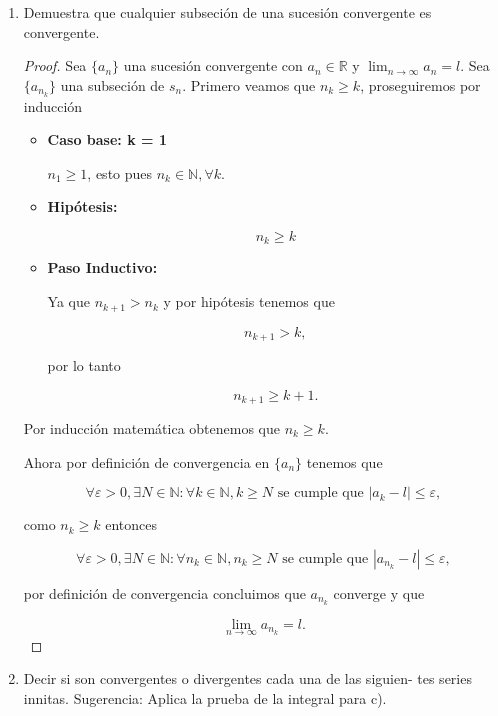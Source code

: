\documentclass[letterpaper]{article}
\theoremstyle{definition}
\theoremstyle{lemathm}
\theoremstyle{lemademthm}
\newcommand{\limninf}{\lim_{n\to\infty}}
\newcommand{\N}{\mathbb{N}}
\newcommand{\R}{\mathbb{R}}
\begin{document}
\begin{enumerate}
\begin{proof}
		\end{proof}

		\item Demuestra que cualquier subseción de una sucesión convergente es convergente.
		
		\begin{proof}
			Sea $\{a_n\}$ una sucesión convergente con $a_n \in \R$ y $\limninf a_n = l$. Sea $\{a_{n_k}\}$ una subseción de $s_n$. Primero veamos que $n_k \geq k$, proseguiremos por inducción

			\begin{itemize}
				\item \textbf{Caso base: k = 1}
				
				$n_1 \geq 1$, esto pues $n_k \in \N, \forall k$.

				\item \textbf{Hipótesis:}
				
				\[n_k \geq k\]

				\item \textbf{Paso Inductivo:}
				
				Ya que $n_{k+1} > n_k$ y por hipótesis tenemos que

				\[n_{k+1} > k,\]

				por lo tanto

				\[n_{k+1} \geq k + 1.\]

			\end{itemize}

			Por inducción matemática obtenemos que $n_k \geq k$.

			Ahora por definición de convergencia en $\{a_n\}$ tenemos que

			\[\forall \varepsilon > 0, \exists N \in \N : \forall k \in \N, k \geq N \text{ se cumple que } |a_k - l| \leq \varepsilon,\]

			como $n_k \geq k$ entonces

			\[\forall \varepsilon > 0, \exists N \in \N : \forall n_k \in \N, n_k \geq N \text{ se cumple que } |a_{n_k} - l| \leq \varepsilon,\]

			por definición de convergencia concluimos que $a_{n_k}$ converge y que

			\[\limninf a_{n_k} = l.\]

		\end{proof}

		\item Decir si son convergentes o divergentes cada una de las siguien-
		tes series innitas. Sugerencia: Aplica la prueba de la integral para c).


\end{enumerate}
\end{document}
